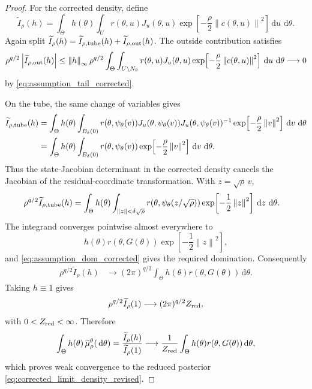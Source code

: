 \documentclass[11pt]{article}
\newcommand{\dd}{\,\mathrm{d}}
\newcommand{\abs}[1]{\left\lvert #1\right\rvert}
\newcommand{\norm}[1]{\left\lVert #1\right\rVert}
\begin{document}
\begin{proof}
For the corrected density, define
\begin{equation}
 \widetilde I_\rho(h)
 =
 \int_\Theta h(\theta)
 \int_U
 r(\theta,u)J_u(\theta,u)
 \exp\!\left[-\frac{\rho}{2}\norm{c(\theta,u)}^2\right]
 \dd u\,\dd\theta .
 \label{eq:I_tilde_rho_h}
\end{equation}
Again split
\(\widetilde I_\rho(h)=\widetilde I_{\rho,{\rm tube}}(h)+
\widetilde I_{\rho,{\rm out}}(h)\). The outside contribution satisfies
\[
 \rho^{q/2}\abs{\widetilde I_{\rho,{\rm out}}(h)}
 \le
 \norm{h}_\infty
 \rho^{q/2}
 \int_\Theta\int_{U\setminus N_\theta}
 r(\theta,u)J_u(\theta,u)
 \exp\!\left[-\frac{\rho}{2}\norm{c(\theta,u)}^2\right]
 \dd u\,\dd\theta
 \longrightarrow 0
\]
by \eqref{eq:assumption_tail_corrected}.

On the tube, the same change of variables gives
\begin{align}
 \widetilde I_{\rho,{\rm tube}}(h)
 &=
 \int_\Theta h(\theta)
 \int_{B_\delta(0)}
 r(\theta,\psi_\theta(v))
 J_u(\theta,\psi_\theta(v))
 J_u(\theta,\psi_\theta(v))^{-1}
 \exp\!\left[-\frac{\rho}{2}\norm{v}^2\right]
 \dd v\,\dd\theta \notag\\
 &=
 \int_\Theta h(\theta)
 \int_{B_\delta(0)}
 r(\theta,\psi_\theta(v))
 \exp\!\left[-\frac{\rho}{2}\norm{v}^2\right]
 \dd v\,\dd\theta .
 \label{eq:I_tilde_cancel}
\end{align}
Thus the state-Jacobian determinant in the corrected density cancels the Jacobian of the residual-coordinate transformation. With \(z=\sqrt{\rho}\,v\),
\begin{align}
 \rho^{q/2}\widetilde I_{\rho,{\rm tube}}(h)
 &=
 \int_\Theta h(\theta)
 \int_{\norm{z}<\delta\sqrt{\rho}}
 r(\theta,\psi_\theta(z/\sqrt{\rho}))
 \exp\!\left[-\frac{1}{2}\norm{z}^2\right]
 \dd z\,\dd\theta .
 \label{eq:I_tilde_scaled_z}
\end{align}
The integrand converges pointwise almost everywhere to
\[
 h(\theta)r(\theta,G(\theta))
 \exp\!\left[-\frac{1}{2}\norm{z}^2\right],
\]
and \eqref{eq:assumption_dom_corrected} gives the required domination.
Consequently
\begin{align}
 \rho^{q/2}\widetilde I_\rho(h)
 &\longrightarrow
 (2\pi)^{q/2}
 \int_\Theta h(\theta)r(\theta,G(\theta))\dd\theta .
 \label{eq:I_tilde_limit_revised}
\end{align}
Taking \(h\equiv1\) gives
\[
 \rho^{q/2}\widetilde I_\rho(1)
 \longrightarrow
 (2\pi)^{q/2}Z_{\rm red},
\]
with \(0<Z_{\rm red}<\infty\). Therefore
\[
 \int_\Theta h(\theta)\,\widetilde\mu_\rho^\theta(\dd\theta)
 =
 \frac{\widetilde I_\rho(h)}{\widetilde I_\rho(1)}
 \longrightarrow
 \frac{1}{Z_{\rm red}}
 \int_\Theta h(\theta)r(\theta,G(\theta))\dd\theta ,
\]
which proves weak convergence to the reduced posterior
\eqref{eq:corrected_limit_density_revised}.
\end{proof}
\end{document}

